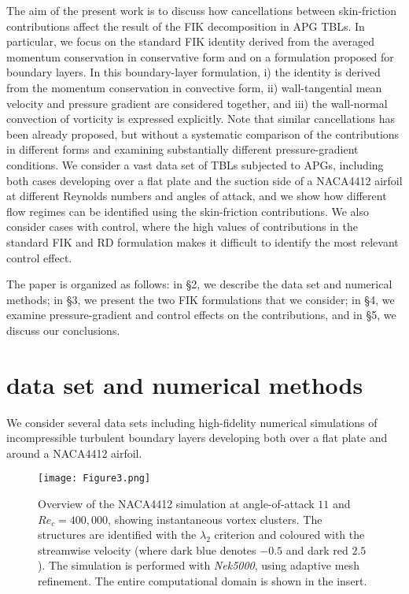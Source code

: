 The aim of the present work is to discuss how cancellations between skin-friction contributions affect the result of the FIK decomposition in APG TBLs. In particular, we focus on the standard FIK identity derived from the averaged momentum conservation in conservative form and on a formulation proposed for boundary layers. In this boundary-layer formulation, i) the identity is derived from the momentum conservation in convective form, ii) wall-tangential mean velocity and pressure gradient are considered together, and iii) the wall-normal convection of vorticity is expressed explicitly. Note that similar cancellations has been already proposed\cite{atzo21,wenz22}, but without a systematic comparison of the contributions in different forms and examining substantially different pressure-gradient conditions. We consider a vast data set of TBLs subjected to APGs, including both cases developing over a flat plate and the suction side of a NACA4412 airfoil at different Reynolds numbers and angles of attack, and we show how different flow regimes can be identified using the skin-friction contributions. We also consider cases with control, where the high values of contributions in the standard FIK and RD formulation makes it difficult to identify the most relevant control effect\cite{atzo21}.

The paper is organized as follows: in \S2, we describe the data set and numerical methods; in \S3, we present the two FIK formulations that we consider; in \S4, we examine pressure-gradient and control effects on the contributions, and in \S5, we discuss our conclusions.


\section{data set and numerical methods}
We consider several data sets including high-fidelity numerical simulations of incompressible turbulent boundary layers developing both over a flat plate and around a NACA4412 airfoil. 

\begin{figure}
\centering
\texttt{[image: Figure3.png]}
\caption{\label{fig:nice} Overview of the NACA4412 simulation at angle-of-attack $11$ and $Re_c=400,000$, showing instantaneous vortex clusters. The structures are identified with the $\lambda_2$ criterion\cite{jeon95} and coloured with the streamwise velocity (where dark blue denotes $-0.5$ and dark red $2.5$). The simulation is performed with \textit{Nek5000}\cite{fischer2008nek5000}, using adaptive mesh refinement\cite{tanarro2020enabling}. The entire computational domain is shown in the insert.}
\end{figure}


